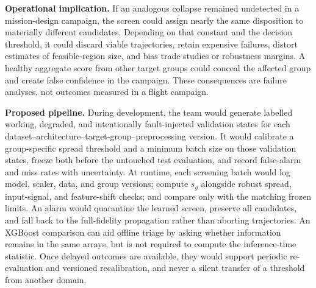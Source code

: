 \documentclass[preprint,12pt,authoryear]{elsarticle}
\begin{document}
\textbf{Operational implication.} If an analogous collapse remained undetected in a mission-design campaign, the screen could assign nearly the same disposition to materially different candidates. Depending on that constant and the decision threshold, it could discard viable trajectories, retain expensive failures, distort estimates of feasible-region size, and bias trade studies or robustness margins. A healthy aggregate score from other target groups could conceal the affected group and create false confidence in the campaign. These consequences are failure analyses, not outcomes measured in a flight campaign.

\textbf{Proposed pipeline.} During development, the team would generate labelled working, degraded, and intentionally fault-injected validation states for each dataset--architecture--target-group--preprocessing version. It would calibrate a group-specific spread threshold and a minimum batch size on those validation states, freeze both before the untouched test evaluation, and record false-alarm and miss rates with uncertainty. At runtime, each screening batch would log model, scaler, data, and group versions; compute $s_g$ alongside robust spread, input-signal, and feature-shift checks; and compare only with the matching frozen limits. An alarm would quarantine the learned screen, preserve all candidates, and fall back to the full-fidelity propagation rather than aborting trajectories. An XGBoost comparison can aid offline triage by asking whether information remains in the same arrays, but is not required to compute the inference-time statistic. Once delayed outcomes are available, they would support periodic re-evaluation and versioned recalibration, and never a silent transfer of a threshold from another domain.
\end{document}
